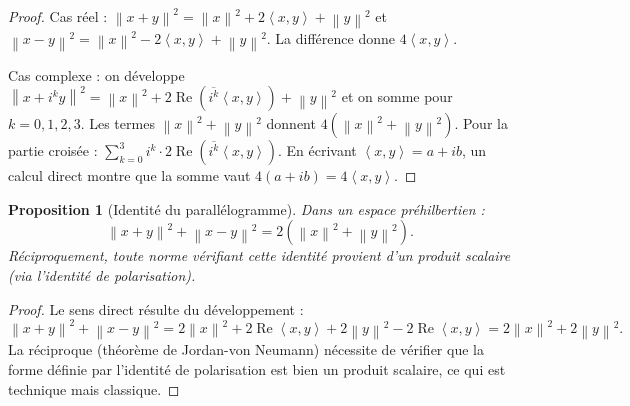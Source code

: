 \documentclass[a4paper,12pt]{book}
\newcommand{\norm}[1]{\left\| #1 \right\|}
\newcommand{\inner}[2]{\left\langle #1, #2 \right\rangle}
\theoremstyle{definition}
\theoremstyle{plain}
\newtheorem{proposition}[definition]{Proposition}
\theoremstyle{remark}
\begin{document}
\begin{proof}
Cas réel : $\norm{x+y}^2 = \norm{x}^2 + 2\inner{x}{y} + \norm{y}^2$ et $\norm{x-y}^2 = \norm{x}^2 - 2\inner{x}{y} + \norm{y}^2$. La différence donne $4\inner{x}{y}$.

Cas complexe : on développe $\norm{x + i^k y}^2 = \norm{x}^2 + 2\operatorname{Re}(\overline{i^k}\inner{x}{y}) + \norm{y}^2$ et on somme pour $k = 0, 1, 2, 3$. Les termes $\norm{x}^2 + \norm{y}^2$ donnent $4(\norm{x}^2 + \norm{y}^2)$. Pour la partie croisée : $\sum_{k=0}^3 i^k \cdot 2\operatorname{Re}(\overline{i^k}\inner{x}{y})$. En écrivant $\inner{x}{y} = a + ib$, un calcul direct montre que la somme vaut $4(a + ib) = 4\inner{x}{y}$.
\end{proof}

\begin{proposition}[Identité du parallélogramme]\label{prop:parallelogramme}
Dans un espace préhilbertien :
\[
    \norm{x + y}^2 + \norm{x - y}^2 = 2(\norm{x}^2 + \norm{y}^2).
\]
Réciproquement, toute norme vérifiant cette identité provient d'un produit scalaire (via l'identité de polarisation).
\end{proposition}

\begin{proof}
Le sens direct résulte du développement :
\[
    \norm{x+y}^2 + \norm{x-y}^2 = 2\norm{x}^2 + 2\operatorname{Re}\inner{x}{y} + 2\norm{y}^2 - 2\operatorname{Re}\inner{x}{y} = 2\norm{x}^2 + 2\norm{y}^2.
\]
La réciproque (théorème de Jordan-von Neumann) nécessite de vérifier que la forme définie par l'identité de polarisation est bien un produit scalaire, ce qui est technique mais classique.
\end{proof}

\begin{center}
\label{fig:parallelogramme}
\end{center}
\end{document}
